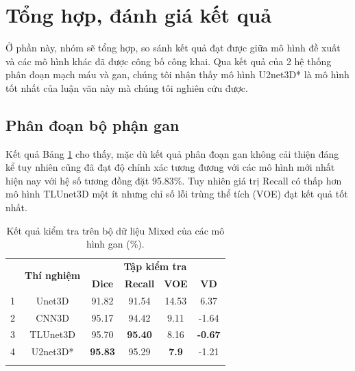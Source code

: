 \section{Tổng hợp, đánh giá kết quả}
Ở phần này, nhóm sẽ tổng hợp, so sánh kết quả đạt được giữa mô hình đề xuất và các mô hình khác đã được công bố công khai. Qua kết quả của 2 hệ thống phân đoạn mạch máu và gan, chúng tôi nhận thấy mô hình U2net3D* là mô hình tốt nhất của luận văn này mà chúng tôi nghiên cứu được.

\subsection{Phân đoạn bộ phận gan}
Kết quả Bảng \ref{tab:liver-result} cho thấy, mặc dù kết quả phân đoạn gan không cải thiện đáng kể  tuy nhiên cũng đã đạt độ chính xác tương đương với các mô hình mới nhất hiện nay với hệ số tương đồng đặt 95.83\%. Tuy nhiên giá trị Recall có thấp hơn mô hình TLUnet3D một ít nhưng chỉ số lỗi trùng thể tích (VOE) đạt kết quả tốt nhất.
\begin{table}[H]
    \renewcommand{\arraystretch}{1.1}
    \centering
    \begin{tabular}{c c c c c c}
        \Xhline{3\arrayrulewidth}
        \multirow{2}{*}{\textbf{STT}} & \multirow{2}{*}{\textbf{Thí nghiệm}} & \multicolumn{4}{c}{\textbf{Tập kiểm tra}} \\ \cline{3-6} 
        & & \textbf{Dice} & \textbf{Recall} & \textbf{VOE} & \textbf{VD} \\ \hline
        1 & Unet3D\cite{LV_LIVER}         & 91.82 & 91.54 & 14.53 & 6.37     \\ \hline
        2 & CNN3D\cite{LV_VESEL}          & 95.17 & 94.42 & 9.11 & -1.64    \\ \hline
        3 & TLUnet3D\cite{LV_VESEL}       & 95.70 & \textbf{95.40} & 8.16 & \textbf{-0.67}\\ \hline
        4 & U2net3D*        & \textbf{95.83}       & 95.29     & \textbf{7.9}   & -1.21      \\ 
        \Xhline{3\arrayrulewidth}
    \end{tabular}
    \caption{Kết quả kiểm tra trên bộ dữ liệu Mixed của các mô hình gan (\%).}
    \label{tab:liver-result}
\end{table} \vspace{-0.2cm}

